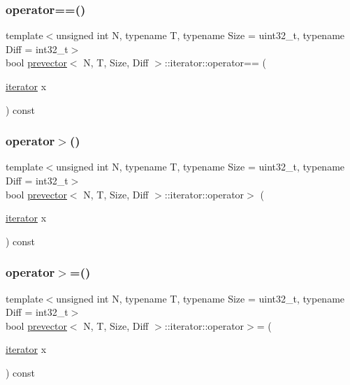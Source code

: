 \subsubsection{\texorpdfstring{operator==()}{operator==()}}
{\footnotesize\ttfamily template$<$unsigned int N, typename T, typename Size = uint32\+\_\+t, typename Diff = int32\+\_\+t$>$ \\
bool \mbox{\hyperlink{classprevector}{prevector}}$<$ N, T, Size, Diff $>$\+::iterator\+::operator== (\begin{DoxyParamCaption}\item[{\mbox{\hyperlink{classprevector_1_1iterator}{iterator}}}]{x }\end{DoxyParamCaption}) const\hspace{0.3cm}{\ttfamily [inline]}}

\mbox{\label{classprevector_1_1iterator_abf1cd6daede5b7f4fbe6e78f409754c1}} 
\subsubsection{\texorpdfstring{operator$>$()}{operator>()}}
{\footnotesize\ttfamily template$<$unsigned int N, typename T, typename Size = uint32\+\_\+t, typename Diff = int32\+\_\+t$>$ \\
bool \mbox{\hyperlink{classprevector}{prevector}}$<$ N, T, Size, Diff $>$\+::iterator\+::operator$>$ (\begin{DoxyParamCaption}\item[{\mbox{\hyperlink{classprevector_1_1iterator}{iterator}}}]{x }\end{DoxyParamCaption}) const\hspace{0.3cm}{\ttfamily [inline]}}

\mbox{\label{classprevector_1_1iterator_a835326570dd75d27fb9a30fd8ba2d1c3}} 
\subsubsection{\texorpdfstring{operator$>$=()}{operator>=()}}
{\footnotesize\ttfamily template$<$unsigned int N, typename T, typename Size = uint32\+\_\+t, typename Diff = int32\+\_\+t$>$ \\
bool \mbox{\hyperlink{classprevector}{prevector}}$<$ N, T, Size, Diff $>$\+::iterator\+::operator$>$= (\begin{DoxyParamCaption}\item[{\mbox{\hyperlink{classprevector_1_1iterator}{iterator}}}]{x }\end{DoxyParamCaption}) const\hspace{0.3cm}{\ttfamily [inline]}}

